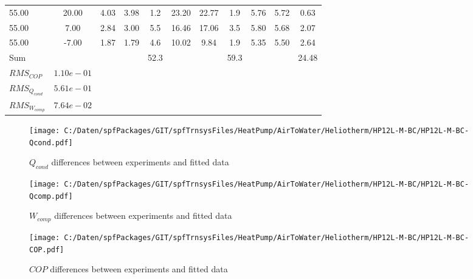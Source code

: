 \documentclass[english]{SPFShortReport}
\begin{document}
\begin{table}[!ht]
\begin{small}
\begin{center}
{\begin{tabular}{l | c c c c c c c c c c }
55.00  & 20.00 & 4.03 & 3.98 & 1.2 & 23.20 & 22.77 & 1.9 & 5.76 & 5.72 & 0.63\\ 
55.00  & 7.00 & 2.84 & 3.00 & 5.5 & 16.46 & 17.06 & 3.5 & 5.80 & 5.68 & 2.07\\ 
55.00  & -7.00 & 1.87 & 1.79 & 4.6 & 10.02 & 9.84 & 1.9 & 5.35 & 5.50 & 2.64\\ 
\hline 
 Sum &  & &  & 52.3 &  &  & 59.3 & &  & 24.48\\ 
\hline 
 $RMS_{COP}$ & $1.10e-01$ \\ 
 $RMS_{Q_{cond}}$ & $5.61e-01$ \\ 
 $RMS_{W_{comp}}$ & $7.64e-02$ \\ 
\hline
\hline
\end{tabular}
}
\label{ErrorsTable}
\end{center}
\end{small}
\end{table}
\begin{figure}[!ht]
\begin{center}
\texttt{[image: C:/Daten/spfPackages/GIT/spfTrnsysFiles/HeatPump/AirToWater/Heliotherm/HP12L-M-BC/HP12L-M-BC-Qcond.pdf]}
\caption{$Q_{cond}$ differences between experiments and fitted data}
\label{QcongFig}
\end{center}
\end{figure}
\begin{figure}[!ht]
\begin{center}
\texttt{[image: C:/Daten/spfPackages/GIT/spfTrnsysFiles/HeatPump/AirToWater/Heliotherm/HP12L-M-BC/HP12L-M-BC-Qcomp.pdf]}
\caption{$W_{comp}$ differences between experiments and fitted data}
\label{QcompFig}
\end{center}
\end{figure}
\begin{figure}[!ht]
\begin{center}
\texttt{[image: C:/Daten/spfPackages/GIT/spfTrnsysFiles/HeatPump/AirToWater/Heliotherm/HP12L-M-BC/HP12L-M-BC-COP.pdf]}
\caption{$COP$ differences between experiments and fitted data}
\label{COPFig}
\end{center}
\end{figure}
\end{document}
